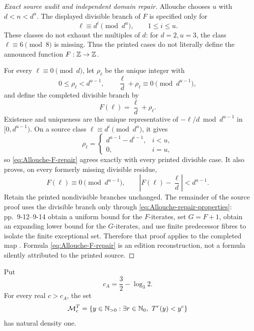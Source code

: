 \begin{proof}[Exact source audit and independent domain repair]
Allouche chooses \(u\) with \(d<n<d^u\).  The displayed divisible branch
of \(F\) is specified only for
\[
 \ell\equiv d^i\pmod{d^u},\qquad1\le i\le u.
\]
These classes do not exhaust the multiples of \(d\): for \(d=2,u=3\), the
class \(\ell\equiv6\pmod8\) is missing.  Thus the printed cases do not
literally define the announced function \(F:\mathbb{Z}\to\mathbb{Z}\).

For every \(\ell\equiv0\pmod d\), let \(\rho_\ell\) be the unique integer
with
\begin{equation}
\label{eq:Allouche-rho-repair}
 0\le\rho_\ell<d^{u-1},
 \qquad
 \frac{\ell}{d}+\rho_\ell\equiv0\pmod{d^{u-1}},
\end{equation}
and define the completed divisible branch by
\begin{equation}
\label{eq:Allouche-F-repair}
 F(\ell)=\frac{\ell}{d}+\rho_\ell.
\end{equation}
Existence and uniqueness are the unique representative of
\(-\ell/d\bmod d^{u-1}\) in \([0,d^{u-1})\).  On a source class
\(\ell\equiv d^i\pmod{d^u}\), it gives
\[
 \rho_\ell=
 \begin{cases}
  d^{u-1}-d^{i-1},&i<u,\\
  0,&i=u,
 \end{cases}
\]
so \eqref{eq:Allouche-F-repair} agrees exactly with every printed divisible
case.  It also proves, on every formerly missing divisible residue,
\begin{equation}
\label{eq:Allouche-repair-properties}
 F(\ell)\equiv0\pmod{d^{u-1}},
 \qquad
 \left|F(\ell)-\frac{\ell}{d}\right|<d^{u-1}.
\end{equation}
Retain the printed nondivisible branches unchanged.  The remainder of the
source proof uses the divisible branch only through
\eqref{eq:Allouche-repair-properties}: pp.~9-12--9-14 obtain a uniform bound
for the \(F\)-iterates, set \(G=F+1\), obtain an expanding lower bound for
the \(G\)-iterates, and use finite predecessor fibres to isolate the finite
exceptional set.  Therefore that proof applies to the completed map
\cite[pp.~9-04, 9-12--9-14]{Allouche1979}.  Formula
\eqref{eq:Allouche-F-repair} is an edition reconstruction, not a formula
silently attributed to the printed source.
\end{proof}

\begin{proposition}
\label{prop:Allouche-threshold-extraction}
Put
\begin{equation}
\label{eq:Allouche-cA}
 c_A=\frac32-\log_3 2.
\end{equation}
For every real \(c>c_A\), the set
\begin{equation}
\label{eq:Allouche-Mc}
 \mathcal M_c^{T}
 =\{y\in\mathbb{N}_{>0}:\exists r\in\mathbb{N}_{0},\ T^r(y)<y^c\}
\end{equation}
has natural density one.
\end{proposition}

